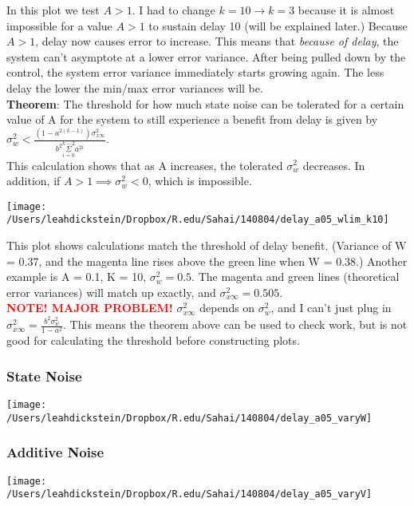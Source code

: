 \documentclass[leqno,twocolumn]{article}
\begin{document}
In this plot we test $A > 1$. I had to change $k = 10 \rightarrow k = 3$ because it is almost impossible for a value $ A > 1$ to sustain delay 10 (will be explained later.) Because $A > 1$, delay now causes error to increase. This means that \textit{because of delay}, the system can't asymptote at a lower error variance. After being pulled down by the control, the system error variance immediately starts growing again. The less delay the lower the min/max error variances will be.\\

\textbf{Theorem}: The threshold for how much state noise can be tolerated for a certain value of A for the system to still experience a benefit from delay is given by $\sigma_w^2 < \frac{(1-a^{2(k-1)})\sigma^2_{x\infty}}{b^2 \overset{k-2}{\underset{i=0}{\Sigma}} a^{2i}}$.\\

This calculation shows that as A increases, the tolerated $\sigma_w^2$ decreases. In addition, if $A > 1 \implies \sigma_w^2 < 0$, which is impossible.

\begin{center}
\texttt{[image: /Users/leahdickstein/Dropbox/R.edu/Sahai/140804/delay\_a05\_wlim\_k10]}\end{center}

This plot shows calculations match the threshold of delay benefit. (Variance of W = 0.37, and the magenta line rises above the green line when W = 0.38.) Another example is A = 0.1, K = 10, $\sigma_w^2 = 0.5$. The magenta and green lines (theoretical error variances) will match up exactly, and $\sigma_{x\infty}^2 = 0.505$.\\

\textcolor{red}{\textbf{NOTE! MAJOR PROBLEM!}} $\sigma^2_{x\infty}$ depends on $\sigma_w^2$, and I can't just plug in $\sigma^2_{x\infty} = \frac{b^2\sigma_w^2}{1-a^2}$. This means the theorem above can be used to check work, but is not good for calculating the threshold before constructing plots.

\subsubsection{State Noise}
\begin{center}
\texttt{[image: /Users/leahdickstein/Dropbox/R.edu/Sahai/140804/delay\_a05\_varyW]}\end{center}

\subsubsection*{Additive Noise}
\begin{center}
\texttt{[image: /Users/leahdickstein/Dropbox/R.edu/Sahai/140804/delay\_a05\_varyV]}\end{center}
\end{document}
